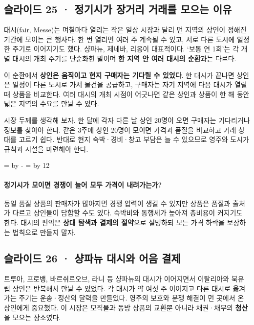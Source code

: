 \documentclass[10pt,a4paper]{article}
\newcommand{\ReserveQuestionSpace}{%
  \par\begingroup
  \dimen0=\pagegoal \advance\dimen0 by -\pagetotal
  \dimen2=\baselineskip \multiply\dimen2 by 12
  \ifdim\dimen0<\dimen2 \newpage\fi
  \endgroup}
\begin{document}
\subsection{슬라이드 25 · 정기시가 장거리 거래를 모으는 이유}
대시(fair, Messe)는 며칠마다 열리는 작은 일상 시장과 달리 먼 지역의 상인이 정해진 기간에 모이는 큰 행사다. 한 번 열리면 여러 주 계속될 수 있고, 서로 다른 도시에 일정한 주기로 이어지기도 했다. 샹파뉴, 제네바, 리옹이 대표적이다. ‘보통 연 1회’는 각 개별 대시의 개최 주기를 단순화한 말이며 \textbf{한 지역 안 여러 대시의 순환}과는 다르다.\par

이 순환에서 \textbf{상인은 움직이고 현지 구매자는 기다릴 수 있었다}. 한 대시가 끝나면 상인은 일정이 다른 도시로 가서 물건을 공급하고, 구매자는 자기 지역에 다음 대시가 열릴 때 상품을 비교한다. 여러 대시의 개최 시점이 어긋나면 같은 상인과 상품이 한 해 동안 넓은 지역의 수요를 만날 수 있다.\par

시장 두께를 생각해 보자. 한 달에 각자 다른 날 상인 20명이 오면 구매자는 기다리거나 정보를 찾아야 한다. 같은 3주에 상인 20명이 모이면 가격과 품질을 비교하고 거래 상대를 고르기 쉽다. 반대로 현지 숙박·경비·창고 부담은 늘 수 있으므로 영주와 도시가 규칙과 시설을 마련해야 한다.\par

\ReserveQuestionSpace
\paragraph{정기시가 모이면 경쟁이 늘어 모두 가격이 내려가는가?}
동일 품질 상품의 판매자가 많아지면 경쟁 압력이 생길 수 있지만 상품은 품질과 출처가 다르고 상인들이 담합할 수도 있다. 숙박비와 통행세가 높아져 총비용이 커지기도 한다. 대시의 편익은 \textbf{상대 탐색과 결제의 절약}으로 설명하되 모든 가격 하락을 보장하는 법칙으로 만들지 말자.\par

\subsection{슬라이드 26 · 샹파뉴 대시와 어음 결제}
트루아, 프로뱅, 바르쉬르오브, 라니 등 샹파뉴의 대시가 이어지면서 이탈리아와 북유럽 상인은 반복해서 만날 수 있었다. 각 대시가 약 여섯 주 이어지고 다른 대시로 옮겨 가는 주기는 운송·정산의 달력을 만들었다. 영주의 보호와 분쟁 해결이 먼 곳에서 온 상인에게 중요했다. 이 시장은 모직물과 동방 상품의 교환뿐 아니라 채권·채무의 \textbf{청산}을 모으는 장소였다.\par
\end{document}
